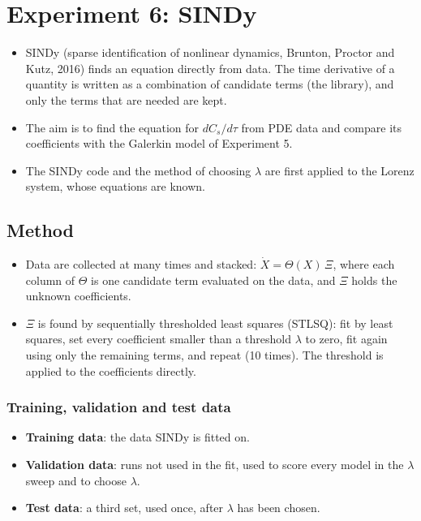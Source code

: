 \documentclass[11pt,a4paper]{article}
\begin{document}
\section{Experiment 6: SINDy}
\begin{itemize}
  \item SINDy (sparse identification of nonlinear dynamics, Brunton, Proctor and Kutz, 2016) finds an equation directly from data. The time derivative of a quantity is written as a combination of candidate terms (the library), and only the terms that are needed are kept.
  \item The aim is to find the equation for $dC_s/d\tau$ from PDE data and compare its coefficients with the Galerkin model of Experiment 5.
  \item The SINDy code and the method of choosing $\lambda$ are first applied to the Lorenz system, whose equations are known.
\end{itemize}

\subsection{Method}
\begin{itemize}
  \item Data are collected at many times and stacked: $\dot X=\Theta(X)\,\Xi$, where each column of $\Theta$ is one candidate term evaluated on the data, and $\Xi$ holds the unknown coefficients.
  \item $\Xi$ is found by sequentially thresholded least squares (STLSQ): fit by least squares, set every coefficient smaller than a threshold $\lambda$ to zero, fit again using only the remaining terms, and repeat (10 times). The threshold is applied to the coefficients directly.
\end{itemize}

\subsubsection{Training, validation and test data}
\begin{itemize}
  \item \textbf{Training data}: the data SINDy is fitted on.
  \item \textbf{Validation data}: runs not used in the fit, used to score every model in the $\lambda$ sweep and to choose $\lambda$.
  \item \textbf{Test data}: a third set, used once, after $\lambda$ has been chosen.
\end{itemize}
\end{document}
